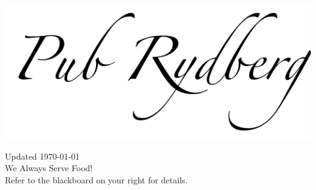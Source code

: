 \begin{titlepage}
\begin{center}

\vspace*{8cm}

\includegraphics{Figures/rydbergtext.png}

\vspace*{4cm}
{\selectfont
{\small Updated \today}\\[2cm] %

{\Large We Always Serve Food!}\\
Refer to the blackboard on your right for details.
}

\vfill

\end{center}
\end{titlepage}
